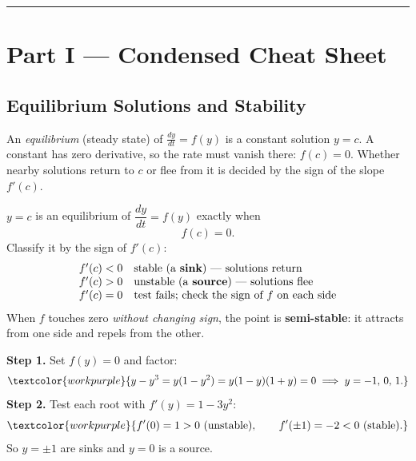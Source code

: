 \vspace{0.6em}
\hrule
\vspace{0.6em}

{}
\section*{Part I --- Condensed Cheat Sheet}
\setcounter{section}{4}   %

\subsection{Equilibrium Solutions and Stability}

An \emph{equilibrium} (steady state) of $\frac{dy}{dt} = f(y)$ is a constant
solution $y = c$. A constant has zero derivative, so the rate must vanish there:
$f(c) = 0$. Whether nearby solutions return to $c$ or flee from it is decided by
the sign of the slope $f'(c)$.

\begin{formulabox}
$y = c$ is an equilibrium of $\dfrac{dy}{dt}=f(y)$ exactly when
\[ f(c) = 0. \]
Classify it by the sign of $f'(c)$:
\[
\begin{array}{ll}
f'(c) < 0 & \text{stable (a \textbf{sink}) --- solutions return}\\
f'(c) > 0 & \text{unstable (a \textbf{source}) --- solutions flee}\\
f'(c) = 0 & \text{test fails; check the sign of } f \text{ on each side}
\end{array}
\]
When $f$ touches zero \emph{without changing sign}, the point is
\textbf{semi-stable}: it attracts from one side and repels from the other.
\end{formulabox}

\begin{examplebox}[Worked Example 4.1: Classify the equilibria of $\frac{dy}{dt}=y-y^{3}$]
\textbf{Step 1.} Set $f(y)=0$ and factor:
\[ \textcolor{workpurple}{y - y^{3} = y(1-y^{2}) = y(1-y)(1+y) = 0 \;\Longrightarrow\; y = -1,\,0,\,1.} \]
\textbf{Step 2.} Test each root with $f'(y) = 1 - 3y^{2}$:
\[ \textcolor{workpurple}{f'(0) = 1 > 0\ (\text{unstable}), \qquad f'(\pm 1) = -2 < 0\ (\text{stable}).} \]
So $y=\pm 1$ are sinks and $y=0$ is a source.
\end{examplebox}

